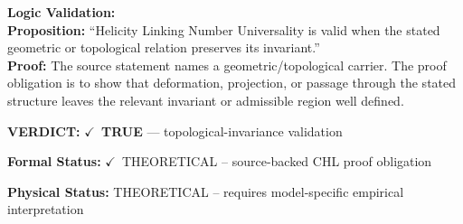 \textbf{Logic Validation:}\\
\textbf{Proposition:} ``Helicity Linking Number Universality is valid when the stated geometric or topological
relation preserves its invariant.''\\
\textbf{Proof:} The source statement names a geometric/topological carrier. The proof obligation is to
show that deformation, projection, or passage through the stated structure leaves the
relevant invariant or admissible region well defined.

\textbf{VERDICT:} \ensuremath{\checkmark}\ \textbf{TRUE} --- topological-invariance validation

\textbf{Formal Status:} \ensuremath{\checkmark}\ THEORETICAL -- source-backed CHL proof obligation

\textbf{Physical Status:} THEORETICAL -- requires model-specific empirical interpretation
\par\vspace{0.45em}
\par
\ifTZPDarkEdition
{}
\fi
\endgroup
\endgroup
